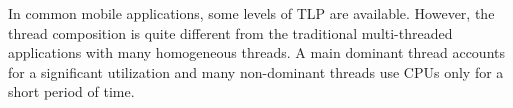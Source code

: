 In common mobile applications, some levels of TLP are available. However, the thread composition is
quite different from the traditional multi-threaded applications with many homogeneous threads.
A main dominant thread accounts for a significant utilization and many non-dominant threads use
CPUs only for a short period of time. 

\begin{comment}
\begin{figure}[bt]
\begin{center}
\epsfig{figure=graphs/angry_thread.eps, width=8cm}
\epsfig{figure=graphs/browser_thread.eps, width=8cm}
\end{center}
\caption{Application threads with 2 cores}
\label{fig:threads}
\end{figure}
\end{comment}

\begin{comment}
Figure~\ref{fig:threads} presents the CPU utilization of active threads with 2 core runs.
For both applications, the top thread dominates core utilization. For the game application,
there is only a small amount of utilization by the rest of threads, causing unbalanced loads
in two cores. For the browser application, there are several other active threads, which
can share the second core.
\end{comment}
